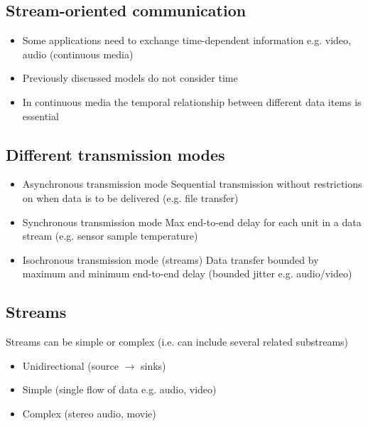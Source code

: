 \subsection{Stream-oriented communication}
\begin{itemize}
	\item Some applications need to exchange time-dependent information e.g. video, audio (continuous media)
	\item Previously discussed models do not consider time
	\item In continuous media the temporal relationship between different data items is essential	
\end{itemize}

\subsection{Different transmission modes}
\begin{itemize}
	\item Asynchronous transmission mode
	\subitem Sequential transmission without restrictions on when data is to be delivered (e.g. file transfer)
	\item Synchronous transmission mode
	\subitem Max end-to-end delay for each unit in a data stream (e.g. sensor sample temperature)
	\item Isochronous transmission mode (streams)
	\subitem Data transfer bounded by maximum and minimum end-to-end delay (bounded jitter e.g. audio/video)	
\end{itemize}

\subsection{Streams}
Streams can be simple or complex (i.e. can include several related substreams)
\begin{itemize}
	\item Unidirectional (source $\rightarrow$ sinks)
	\item Simple (single flow of data e.g. audio, video)
	\item Complex (stereo audio, movie)	
\end{itemize}

